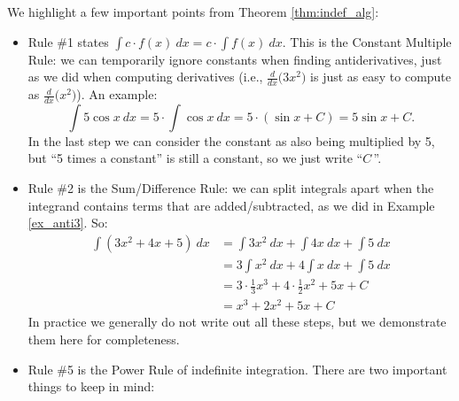 

We highlight a few important points from Theorem \ref{thm:indef_alg}:
\begin{itemize}
	\item		Rule \#1 states $\int c\cdot f(x)\ dx = c\cdot \int f(x)\ dx$. This is the Constant Multiple Rule:  we can temporarily ignore constants when finding antiderivatives, just as we did when computing derivatives (i.e., $\frac{d}{dx}\big(3x^2\big)$ is just as easy to compute as $\frac{d}{dx}\big(x^2\big)$). An example:
	$$\int 5\cos x\ dx = 5\cdot\int \cos x\ dx = 5\cdot (\sin x+C) = 5\sin x + C.$$
	In the last step we can consider the constant as also being multiplied by 5, but ``5 times a constant'' is still a constant, so we just write ``$C$\,''.
	\item		Rule \#2 is the Sum/Difference Rule: we can split integrals apart when the integrand contains terms that are added/subtracted, as we did in Example \ref{ex_anti3}. So:
	\begin{align*}
	\int(3x^2+4x+5)\ dx &= \int 3x^2\ dx + \int 4x\ dx + \int 5\ dx \\
											&= 3\int x^2\ dx + 4\int x\ dx + \int 5 \ dx\\
											&= 3\cdot \frac13x^3 + 4\cdot \frac12x^2+5x+C\\
											&= x^3+2x^2+5x+C
	\end{align*}
	In practice we generally do not write out all these steps, but we demonstrate them here for completeness.
	\item		Rule \#5 is the Power Rule of indefinite integration. There are two important things to keep in mind:
		\begin{enumerate}

\end{enumerate}
\end{itemize}
